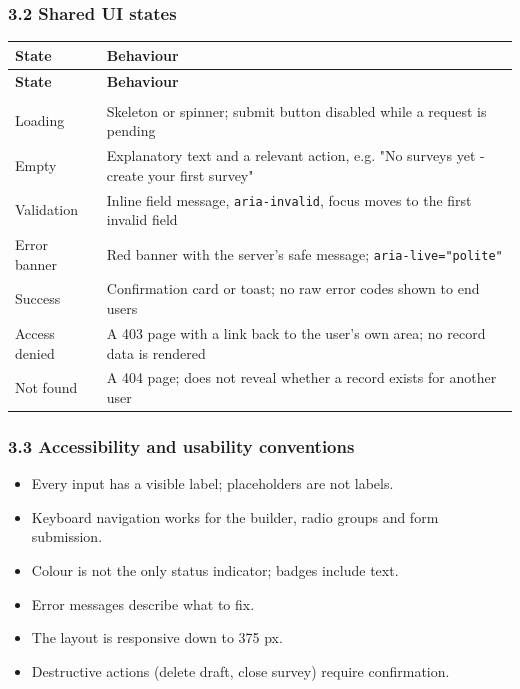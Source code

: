 \documentclass[12pt,a4paper]{article}
\begin{document}
\subsubsection*{3.2 Shared UI states}
{\setlength{\tabcolsep}{3pt}\renewcommand{\arraystretch}{1.08}\small
\begin{longtable}{@{}>{\raggedright\arraybackslash}p{}>{\raggedright\arraybackslash}p{}@{}}
\toprule
\textbf{State} & \textbf{Behaviour} \\
\midrule
\endfirsthead
\toprule
\textbf{State} & \textbf{Behaviour} \\
\midrule
\endhead
\midrule
\multicolumn{2}{r}{\footnotesize\textit{Continued on next page}}\\
\endfoot
\bottomrule
\endlastfoot
Loading & Skeleton or spinner; submit button disabled while a request is pending \\
Empty & Explanatory text and a relevant action, e.g. "No surveys yet - create your first survey" \\
Validation & Inline field message, \texttt{aria-invalid}, focus moves to the first invalid field \\
Error banner & Red banner with the server's safe message; \texttt{aria-live="polite"} \\
Success & Confirmation card or toast; no raw error codes shown to end users \\
Access denied & A 403 page with a link back to the user's own area; no record data is rendered \\
Not found & A 404 page; does not reveal whether a record exists for another user \\
\end{longtable}}

\subsubsection*{3.3 Accessibility and usability conventions}
\begin{itemize}[leftmargin=*]
\item Every input has a visible label; placeholders are not labels.
\item Keyboard navigation works for the builder, radio groups and form submission.
\item Colour is not the only status indicator; badges include text.
\item Error messages describe what to fix.
\item The layout is responsive down to 375 px.
\item Destructive actions (delete draft, close survey) require confirmation.
\end{itemize}
\end{document}
